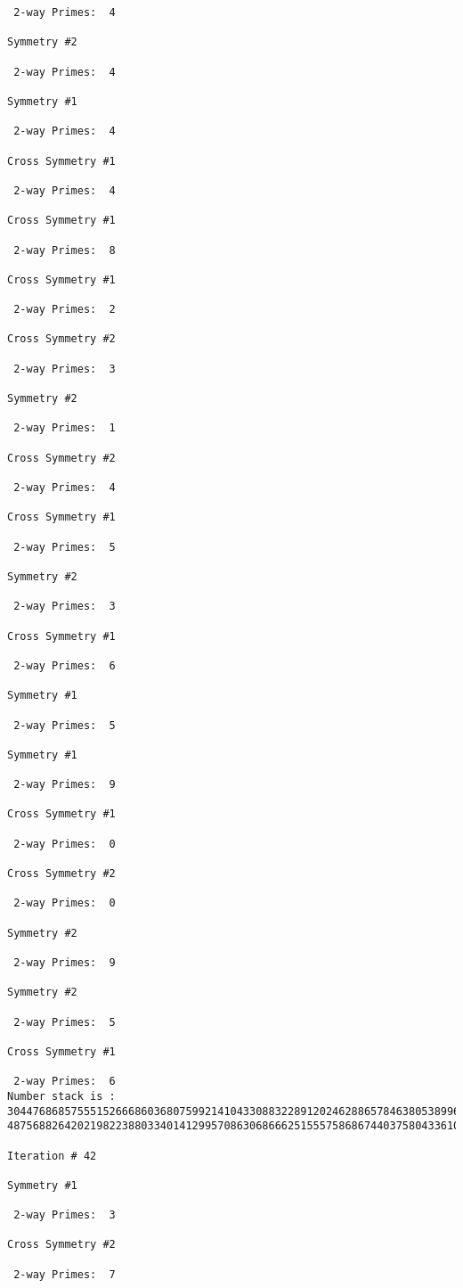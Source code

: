 \begin{verbatim}
 2-way Primes: 	4

Symmetry #2

 2-way Primes: 	4

Symmetry #1

 2-way Primes: 	4

Cross Symmetry #1

 2-way Primes: 	4

Cross Symmetry #1

 2-way Primes: 	8

Cross Symmetry #1

 2-way Primes: 	2

Cross Symmetry #2

 2-way Primes: 	3

Symmetry #2

 2-way Primes: 	1

Cross Symmetry #2

 2-way Primes: 	4

Cross Symmetry #1

 2-way Primes: 	5

Symmetry #2

 2-way Primes: 	3

Cross Symmetry #1

 2-way Primes: 	6

Symmetry #1

 2-way Primes: 	5

Symmetry #1

 2-way Primes: 	9

Cross Symmetry #1

 2-way Primes: 	0

Cross Symmetry #2

 2-way Primes: 	0

Symmetry #2

 2-way Primes: 	9

Symmetry #2

 2-way Primes: 	5

Cross Symmetry #1

 2-way Primes: 	6
Number stack is :
30447686857555152666860368075992141043308832289120246288657846380538996794608835958544046240163340857
48756882642021982238803340141299570863068666251555758686744037580433610426404458595388064976998350836

Iteration #	42

Symmetry #1

 2-way Primes: 	3

Cross Symmetry #2

 2-way Primes: 	7


\end{verbatim}
